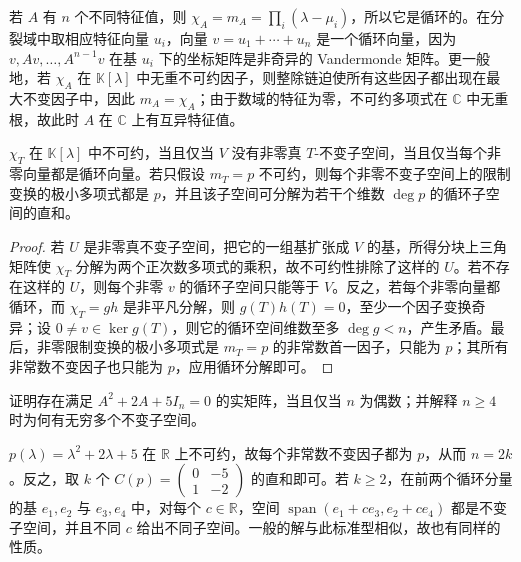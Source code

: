 若 $A$ 有 $n$ 个不同特征值，则 $\chi_A=m_A=\prod_i(\lambda-\mu_i)$，所以它是循环的。在分裂域中取相应特征向量 $u_i$，向量 $v=u_1+\cdots+u_n$ 是一个循环向量，因为 $v,Av,\ldots,A^{n-1}v$ 在基 $u_i$ 下的坐标矩阵是非奇异的 Vandermonde 矩阵。更一般地，若 $\chi_A$ 在 $\mathbb K[\lambda]$ 中无重不可约因子，则整除链迫使所有这些因子都出现在最大不变因子中，因此 $m_A=\chi_A$；由于数域的特征为零，不可约多项式在 $\mathbb C$ 中无重根，故此时 $A$ 在 $\mathbb C$ 上有互异特征值。

\begin{proposition}
$\chi_T$ 在 $\mathbb K[\lambda]$ 中不可约，当且仅当 $V$ 没有非零真 $T$-不变子空间，当且仅当每个非零向量都是循环向量。若只假设 $m_T=p$ 不可约，则每个非零不变子空间上的限制变换的极小多项式都是 $p$，并且该子空间可分解为若干个维数 $\deg p$ 的循环子空间的直和。
\end{proposition}
\begin{proof}
若 $U$ 是非零真不变子空间，把它的一组基扩张成 $V$ 的基，所得分块上三角矩阵使 $\chi_T$ 分解为两个正次数多项式的乘积，故不可约性排除了这样的 $U$。若不存在这样的 $U$，则每个非零 $v$ 的循环子空间只能等于 $V$。反之，若每个非零向量都循环，而 $\chi_T=gh$ 是非平凡分解，则 $g(T)h(T)=0$，至少一个因子变换奇异；设 $0\ne v\in\ker g(T)$，则它的循环空间维数至多 $\deg g<n$，产生矛盾。最后，非零限制变换的极小多项式是 $m_T=p$ 的非常数首一因子，只能为 $p$；其所有非常数不变因子也只能为 $p$，应用循环分解即可。
\end{proof}

\begin{example}
证明存在满足 $A^2+2A+5I_n=0$ 的实矩阵，当且仅当 $n$ 为偶数；并解释 $n\geq4$ 时为何有无穷多个不变子空间。
\end{example}
\begin{solve}
$p(\lambda)=\lambda^2+2\lambda+5$ 在 $\mathbb R$ 上不可约，故每个非常数不变因子都为 $p$，从而 $n=2k$。反之，取 $k$ 个 $C(p)=\left(\begin{smallmatrix}0&-5\\1&-2\end{smallmatrix}\right)$ 的直和即可。若 $k\geq2$，在前两个循环分量的基 $e_1,e_2$ 与 $e_3,e_4$ 中，对每个 $c\in\mathbb R$，空间 $\operatorname{span}(e_1+ce_3,e_2+ce_4)$ 都是不变子空间，并且不同 $c$ 给出不同子空间。一般的解与此标准型相似，故也有同样的性质。
\end{solve}


